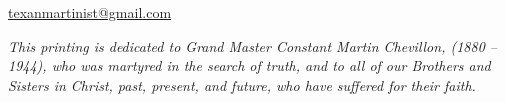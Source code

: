 \url{texanmartinist@gmail.com}

\vspace*{\fill}

\blankpage


\vspace*{\fill}

	\begin{center}
	\end{center}
	
\vspace*{\fill}

\textit{This printing is dedicated to Grand Master Constant Martin Chevillon, \sigi{} (1880 -- 1944), who was martyred in the search of truth, and to all of our Brothers and Sisters in Christ, past, present, and future, who have suffered for their faith.}

\vspace*{\fill}

	\begin{center}
	\end{center}
	
\vspace*{\fill}

\restoregeometry

\blankpage